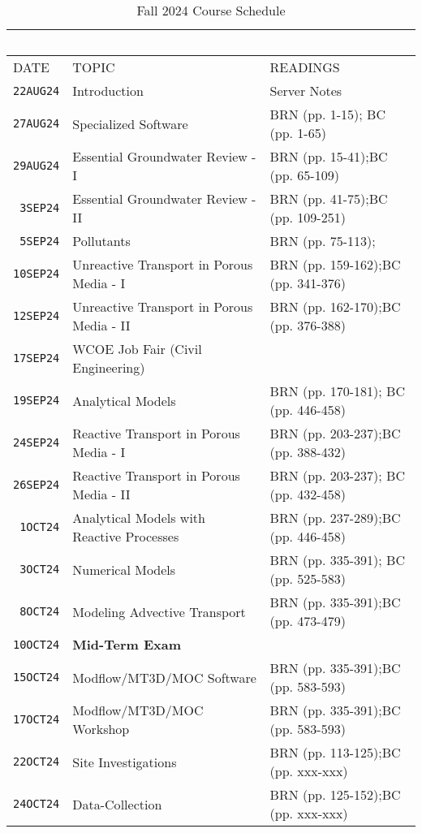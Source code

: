 \documentclass[12pt]{article}
\begin{document}
\begin{table}[ht!]
   \centering
   \caption{Fall 2024 Course Schedule}
   \begin{tabular}{p{0.5in}p{3.1in}p{3.0in}} 
   ~ & ~ & ~  \\
\hline
DATE & TOPIC & READINGS  \\
\hline
\texttt{22AUG24} & Introduction & Server Notes  \\ %
\texttt{27AUG24} & Specialized Software & BRN (pp. 1-15); BC (pp. 1-65) \\ %
\texttt{29AUG24} & Essential Groundwater Review - I  & BRN (pp. 15-41);BC (pp. 65-109) \\ %
\texttt{~3SEP24} & Essential Groundwater Review - II & BRN (pp. 41-75);BC (pp. 109-251)\\ %
\texttt{~5SEP24} & Pollutants &  BRN (pp. 75-113); \\ %
\texttt{10SEP24} & Unreactive Transport in Porous Media - I &  BRN (pp. 159-162);BC (pp. 341-376)\\ %
\texttt{12SEP24} & Unreactive Transport in Porous Media - II & BRN (pp. 162-170);BC (pp. 376-388)\\ %
\texttt{17SEP24} & WCOE Job Fair (Civil Engineering)   &   \\ %
\texttt{19SEP24} & Analytical Models & BRN (pp. 170-181); BC (pp. 446-458) \\ %
\texttt{24SEP24} & Reactive Transport in Porous Media - I &  BRN (pp. 203-237);BC (pp. 388-432)\\  %
\texttt{26SEP24} & Reactive Transport in Porous Media - II & BRN (pp. 203-237); BC (pp. 432-458) \\ %
\texttt{~1OCT24} & Analytical Models with Reactive Processes & BRN (pp. 237-289);BC (pp. 446-458)\\ %
\texttt{~3OCT24} & Numerical Models & BRN (pp. 335-391); BC (pp. 525-583)  \\  %
\texttt{~8OCT24} & Modeling Advective Transport & BRN (pp. 335-391);BC (pp. 473-479)\\ %
\texttt{10OCT24} & \textbf{Mid-Term Exam} & ~ \\ %
\texttt{15OCT24} & Modflow/MT3D/MOC Software  & BRN (pp. 335-391);BC (pp. 583-593)\\ %
\texttt{17OCT24} & Modflow/MT3D/MOC Workshop & BRN (pp. 335-391);BC (pp. 583-593) \\ %
\texttt{22OCT24} & Site Investigations & BRN (pp. 113-125);BC (pp. xxx-xxx) \\ %
\texttt{24OCT24} & Data-Collection  & BRN (pp. 125-152);BC (pp. xxx-xxx)\\ %

\end{tabular}
\end{table}
\end{document}
